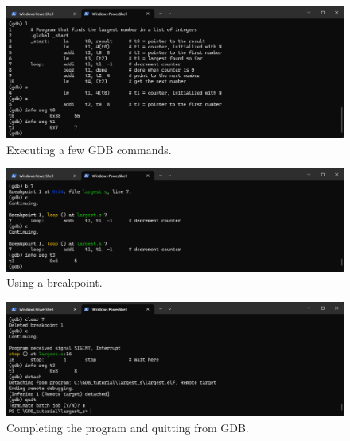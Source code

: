 \documentclass[11pt, twoside, pdftex]{article}
\begin{document}
\begin{figure}[h]
    \begin{center}
        \includegraphics[scale=.6]{figures/gdb2.png}
        \caption{Executing a few GDB commands.}
        \label{fig:gdb2}
    \end{center}
\end{figure}

\begin{figure}[h]
    \begin{center}
        \includegraphics[scale=.6]{figures/gdb3.png}
        \caption{Using a breakpoint.}
        \label{fig:gdb3}
    \end{center}
\end{figure}

\begin{figure}[h]
    \begin{center}
        \includegraphics[scale=.6]{figures/gdb4.png}
        \caption{Completing the program and quitting from GDB.}
        \label{fig:gdb4}
    \end{center}
\end{figure}
\end{document}

